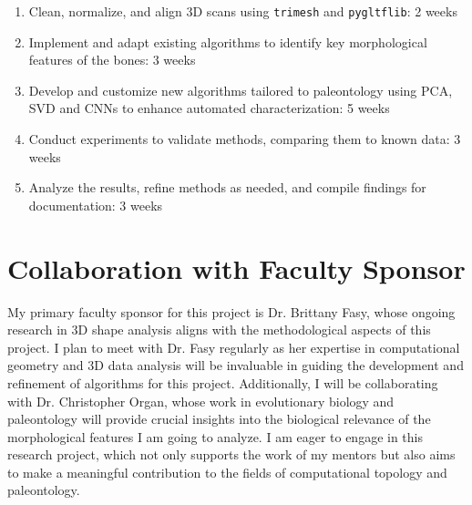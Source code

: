 \documentclass[12pt]{article}
\begin{document}
\begin{enumerate}
	\item Clean, normalize, and align 3D scans using \texttt{trimesh} and
	\texttt{pygltflib}: 2 weeks
	\item Implement and adapt existing algorithms to identify key morphological
	features of the bones: 3 weeks
	\item Develop and customize new algorithms tailored to paleontology using
	PCA, SVD and CNNs to enhance automated characterization: 5 weeks
	\item Conduct experiments to validate methods, comparing them to known data:
	3 weeks
	\item Analyze the results, refine methods as needed, and compile findings
	for documentation: 3 weeks
\end{enumerate}

\section{Collaboration with Faculty Sponsor}
My primary faculty sponsor for this project is Dr. Brittany Fasy, whose ongoing
research in 3D shape analysis aligns with the methodological aspects of this
project. I plan to meet with Dr. Fasy regularly as her expertise in computational 
geometry and 3D data analysis will be invaluable in guiding the development and 
refinement of algorithms for this project. Additionally, I will be collaborating 
with Dr. Christopher Organ, whose work in evolutionary biology and paleontology 
will provide crucial insights into the biological relevance of the morphological 
features I am going to analyze. I am eager to engage in this research project, 
which not only supports the work of my mentors but also aims to make a meaningful 
contribution to the fields of computational topology and paleontology.

\newpage

 
\end{document}
